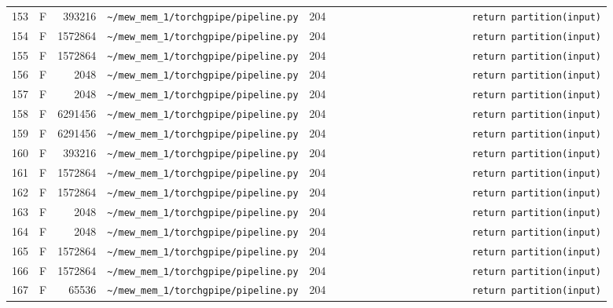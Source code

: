 \documentclass{article}
\begin{document}
\begin{longtable}{r l r p{6.5cm} r p{7.0cm}}
153 & F & 393216 & \lstinline|~/mew_mem_1/torchgpipe/pipeline.py| & 204 & \lstinline|                        return partition(input)| \\
154 & F & 1572864 & \lstinline|~/mew_mem_1/torchgpipe/pipeline.py| & 204 & \lstinline|                        return partition(input)| \\
155 & F & 1572864 & \lstinline|~/mew_mem_1/torchgpipe/pipeline.py| & 204 & \lstinline|                        return partition(input)| \\
156 & F & 2048 & \lstinline|~/mew_mem_1/torchgpipe/pipeline.py| & 204 & \lstinline|                        return partition(input)| \\
157 & F & 2048 & \lstinline|~/mew_mem_1/torchgpipe/pipeline.py| & 204 & \lstinline|                        return partition(input)| \\
158 & F & 6291456 & \lstinline|~/mew_mem_1/torchgpipe/pipeline.py| & 204 & \lstinline|                        return partition(input)| \\
159 & F & 6291456 & \lstinline|~/mew_mem_1/torchgpipe/pipeline.py| & 204 & \lstinline|                        return partition(input)| \\
160 & F & 393216 & \lstinline|~/mew_mem_1/torchgpipe/pipeline.py| & 204 & \lstinline|                        return partition(input)| \\
161 & F & 1572864 & \lstinline|~/mew_mem_1/torchgpipe/pipeline.py| & 204 & \lstinline|                        return partition(input)| \\
162 & F & 1572864 & \lstinline|~/mew_mem_1/torchgpipe/pipeline.py| & 204 & \lstinline|                        return partition(input)| \\
163 & F & 2048 & \lstinline|~/mew_mem_1/torchgpipe/pipeline.py| & 204 & \lstinline|                        return partition(input)| \\
164 & F & 2048 & \lstinline|~/mew_mem_1/torchgpipe/pipeline.py| & 204 & \lstinline|                        return partition(input)| \\
165 & F & 1572864 & \lstinline|~/mew_mem_1/torchgpipe/pipeline.py| & 204 & \lstinline|                        return partition(input)| \\
166 & F & 1572864 & \lstinline|~/mew_mem_1/torchgpipe/pipeline.py| & 204 & \lstinline|                        return partition(input)| \\
167 & F & 65536 & \lstinline|~/mew_mem_1/torchgpipe/pipeline.py| & 204 & \lstinline|                        return partition(input)| \\

\end{longtable}
\end{document}
